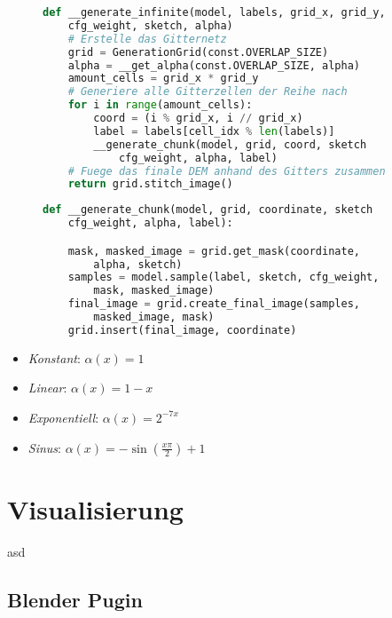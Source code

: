 \begin{figure}[htbp]
\begin{lstlisting}[language=python]
def __generate_infinite(model, labels, grid_x, grid_y,
    cfg_weight, sketch, alpha)
    # Erstelle das Gitternetz
    grid = GenerationGrid(const.OVERLAP_SIZE)
    alpha = __get_alpha(const.OVERLAP_SIZE, alpha)
    amount_cells = grid_x * grid_y
    # Generiere alle Gitterzellen der Reihe nach
    for i in range(amount_cells):
        coord = (i % grid_x, i // grid_x)
        label = labels[cell_idx % len(labels)]
        __generate_chunk(model, grid, coord, sketch
            cfg_weight, alpha, label)
    # Fuege das finale DEM anhand des Gitters zusammen
    return grid.stitch_image()
\end{lstlisting}
    \captionsetup{type=figure}
    \label{fig:gen_infinite}
\end{figure}

\begin{figure}[htbp]
\begin{lstlisting}[language=python]
def __generate_chunk(model, grid, coordinate, sketch
    cfg_weight, alpha, label):

    mask, masked_image = grid.get_mask(coordinate, 
        alpha, sketch)
    samples = model.sample(label, sketch, cfg_weight,
        mask, masked_image)
    final_image = grid.create_final_image(samples, 
        masked_image, mask)
    grid.insert(final_image, coordinate)
\end{lstlisting}
    \captionsetup{type=figure}
    \label{fig:gen_chunk}
\end{figure}

\begin{itemize}
    \item \textit{Konstant}: $\alpha(x) = 1$
    \item \textit{Linear}: $\alpha(x) = 1 - x$
    \item \textit{Exponentiell}: $\alpha(x) = 2^{-7x}$
    \item \textit{Sinus}: $\alpha(x) = -\sin(\frac{x\pi}{2}) + 1$
\end{itemize}

\section {Visualisierung}

asd

\subsection {Blender Pugin}

